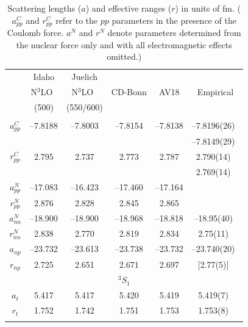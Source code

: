 \documentclass[sort&compress,preprint,3p]{elsarticle}
\begin{document}
\begin{table}[t]
\caption{Scattering lengths ($a$) and effective ranges ($r$) in units of fm.
($a_{pp}^C$ and $r_{pp}^C$ refer to the $pp$ parameters in the presence of
the Coulomb force. $a^N$ and $r^N$ denote parameters determined from the
nuclear force only and with all electromagnetic effects omitted.)
\label{tab_lep}}
\smallskip
\begin{tabular*}{\textwidth}{@{\extracolsep{\fill}}cccccc}
\hline 
\hline 
\noalign{\smallskip}
 & Idaho & Juelich \\
 & N$^3$LO~\cite{EM03} & N$^3$LO~\cite{EGM05} & CD-Bonn\cite{Mac01}
 & AV18\cite{WSS95} & Empirical \\
 & (500) & (550/600) \\
\hline
\noalign{\smallskip}
\multicolumn{6}{c}{\boldmath $^1S_0$} \\
$a_{pp}^C$  &--7.8188 & --7.8003& --7.8154 & --7.8138  
  &--7.8196(26)~\cite{Ber88} \\
  &&&&& --7.8149(29)~\cite{SES83} \\
$r_{pp}^C$  & 2.795   & 2.737& 2.773 & 2.787 
  & 2.790(14)~\cite{Ber88}  \\
  &&&&& 2.769(14)~\cite{SES83} \\
$a_{pp}^N$  &--17.083 & --16.423& --17.460 & --17.164 \\
$r_{pp}^N$  &  2.876  & 2.828& 2.845 & 2.865 \\
$a_{nn}^N$  &--18.900 & --18.900& --18.968 & --18.818 &--18.95(40)~\cite{Gon06,Che08} \\
$r_{nn}^N$  &  2.838  & 2.770& 2.819 & 2.834 &  2.75(11)~\cite{MNS90} \\
$a_{np}  $  &--23.732 & --23.613& --23.738 & --23.732 &--23.740(20)~\cite{Mac01} \\
$r_{np}  $  &  2.725  & 2.651& 2.671 & 2.697 & [2.77(5)]~\cite{Mac01}   \\
\multicolumn{6}{c}{\boldmath $^3S_1$} \\
$a_t$     &  5.417   & 5.417& 5.420 & 5.419 & 5.419(7)~\cite{Mac01}  \\
$r_t$     &  1.752   & 1.742& 1.751 & 1.753 & 1.753(8)~\cite{Mac01}  \\
\hline
\hline
\noalign{\smallskip}
\end{tabular*}
\end{table}
\end{document}
